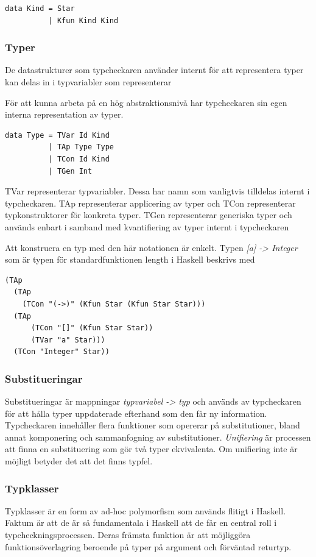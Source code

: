 \begin{lstlisting}
data Kind = Star
          | Kfun Kind Kind
\end{lstlisting}

\subsubsection{Typer}
De datastrukturer som typcheckaren använder internt för att representera typer kan delas in i typvariabler som representerar 

För att kunna arbeta på en hög abstraktionsnivå har typcheckaren sin egen
interna representation av typer.

\begin{lstlisting}
data Type = TVar Id Kind
          | TAp Type Type
          | TCon Id Kind
          | TGen Int     
\end{lstlisting}

TVar representerar typvariabler. Dessa har namn som vanligtvis tilldelas internt i typcheckaren. TAp representerar applicering av typer och TCon representerar typkonstruktorer för konkreta typer. TGen representerar
generiska typer och används enbart i samband med kvantifiering av
typer internt i typcheckaren

Att konstruera en typ med den här notationen är enkelt. Typen \emph{[a] ->
Integer} som är typen för standardfunktionen length i Haskell beskrivs med
\begin{lstlisting}
(TAp
  (TAp
    (TCon "(->)" (Kfun Star (Kfun Star Star)))
  (TAp
      (TCon "[]" (Kfun Star Star))
      (TVar "a" Star)))
  (TCon "Integer" Star))
\end{lstlisting}

\subsubsection{Substitueringar}
Substitueringar är mappningar \emph{typvariabel -> typ} och används av typcheckaren
för att hålla typer uppdaterade efterhand som den får ny
information. Typcheckaren innehåller flera funktioner som opererar på
substitutioner, bland annat komponering och sammanfogning av
substitutioner. \emph{Unifiering} är processen att finna en substituering som gör två typer ekvivalenta. Om unifiering inte är möjligt
betyder det att det finns typfel.

\subsubsection{Typklasser}
Typklasser är en form av ad-hoc polymorfism som används flitigt i
Haskell. Faktum är att de är så fundamentala i Haskell att de får en central
roll i typcheckningsprocessen. Deras främsta funktion är att möjliggöra funktionsöverlagring beroende på typer på argument och förväntad returtyp.

